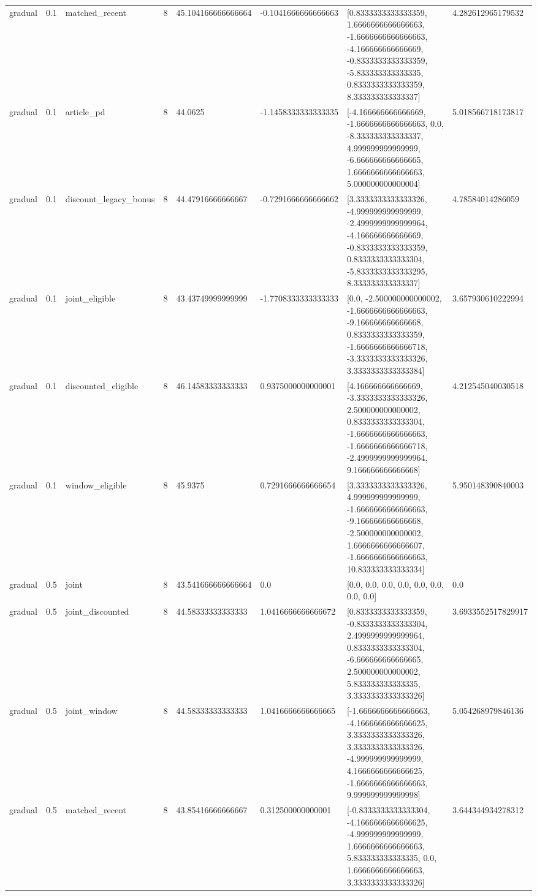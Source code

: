 \begin{tabular}{llllllll}
gradual & 0.1 & matched\_recent & 8 & 45.104166666666664 & -0.1041666666666663 & [0.8333333333333359, 1.6666666666666663, -1.6666666666666663, -4.166666666666669, -0.8333333333333359, -5.833333333333335, 0.8333333333333359, 8.333333333333337] & 4.282612965179532 \\
gradual & 0.1 & article\_pd & 8 & 44.0625 & -1.1458333333333335 & [-4.166666666666669, -1.6666666666666663, 0.0, -8.333333333333337, 4.999999999999999, -6.666666666666665, 1.6666666666666663, 5.000000000000004] & 5.018566718173817 \\
gradual & 0.1 & discount\_legacy\_bonus & 8 & 44.47916666666667 & -0.7291666666666662 & [3.3333333333333326, -4.999999999999999, -2.4999999999999964, -4.166666666666669, -0.8333333333333359, 0.8333333333333304, -5.8333333333333295, 8.333333333333337] & 4.78584014286059 \\
gradual & 0.1 & joint\_eligible & 8 & 43.43749999999999 & -1.7708333333333333 & [0.0, -2.500000000000002, -1.6666666666666663, -9.166666666666668, 0.8333333333333359, -1.6666666666666718, -3.3333333333333326, 3.3333333333333384] & 3.657930610222994 \\
gradual & 0.1 & discounted\_eligible & 8 & 46.14583333333333 & 0.9375000000000001 & [4.166666666666669, -3.3333333333333326, 2.500000000000002, 0.8333333333333304, -1.6666666666666663, -1.6666666666666718, -2.4999999999999964, 9.166666666666668] & 4.212545040030518 \\
gradual & 0.1 & window\_eligible & 8 & 45.9375 & 0.7291666666666654 & [3.3333333333333326, 4.999999999999999, -1.6666666666666663, -9.166666666666668, -2.500000000000002, 1.6666666666666607, -1.6666666666666663, 10.833333333333334] & 5.950148390840003 \\
gradual & 0.5 & joint & 8 & 43.541666666666664 & 0.0 & [0.0, 0.0, 0.0, 0.0, 0.0, 0.0, 0.0, 0.0] & 0.0 \\
gradual & 0.5 & joint\_discounted & 8 & 44.58333333333333 & 1.0416666666666672 & [0.8333333333333359, -0.8333333333333304, 2.4999999999999964, 0.8333333333333304, -6.666666666666665, 2.500000000000002, 5.833333333333335, 3.3333333333333326] & 3.6933552517829917 \\
gradual & 0.5 & joint\_window & 8 & 44.58333333333333 & 1.0416666666666665 & [-1.6666666666666663, -4.1666666666666625, 3.3333333333333326, 3.3333333333333326, -4.999999999999999, 4.1666666666666625, -1.6666666666666663, 9.999999999999998] & 5.054268979846136 \\
gradual & 0.5 & matched\_recent & 8 & 43.85416666666667 & 0.312500000000001 & [-0.8333333333333304, -4.1666666666666625, -4.999999999999999, 1.6666666666666663, 5.833333333333335, 0.0, 1.6666666666666663, 3.3333333333333326] & 3.644344934278312 \\

\end{tabular}
